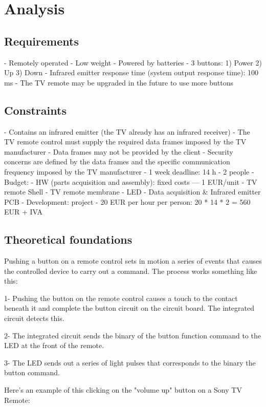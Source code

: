 \chapter{Analysis}
\label{ch:analysis}

\section{Requirements}
\label{sec:requirements}
- Remotely operated
- Low weight
- Powered by batteries
- 3 buttons:
  1) Power
  2) Up
  3) Down
- Infrared emitter response time (system output response time): 100 ms
- The TV remote may be upgraded in the future to use more buttons

\section{Constraints}
\label{sec:constraints}
- Contains an infrared emitter (the TV already has an infrared receiver)
- The TV remote control must supply the required data frames imposed by the TV
  manufacturer
- Data frames may not be provided by the client
- Security concerns are defined by the data frames and the specific
  communication frequency imposed by the TV manufacturer
- 1 week deadline: 14 h
- 2 people
- Budget:
  - HW (parts acquisition and assembly): fixed costs --- 1 EUR/unit
    - TV remote Shell
    - TV remote membrane
    - LED
    - Data acquisition \& Infrared emitter PCB
  - Development: project
    - 20 EUR per hour per person: 20 * 14 * 2 = 560 EUR + IVA

\section{Theoretical foundations}
\label{sec:theor-found}
	Pushing a button on a remote control sets in motion a series of events that causes the controlled device to carry out a command. The process works something like this:
	
1- Pushing the button on the remote control causes a touch to the contact beneath it and complete the button circuit on the circuit board. The integrated circuit detects this.

2- The integrated circuit sends the binary of the button function command to the LED at the front of the remote.

3- The LED sends out a series of light pulses that corresponds to the binary the button command.

Here's an example of this clicking on the "volume up" button on a Sony TV Remote:

